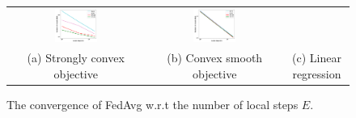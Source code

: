 \begin{figure}
\begin{tabular}{ccc}
	\includegraphics[width=0.33\textwidth]{fig/paper-cvxsmoothspeedupEpochsRounds-min-w8a-epsilon0134-reg0.pdf} & 
	\includegraphics[width=0.33\textwidth]{fig/paper-linregression-newspeedupEpochsRounds-min-linearregressionw8a-epsilon002-reg0.pdf} \\
(a) Strongly convex objective & (b) Convex smooth objective & (c) Linear regression
	\end{tabular}
\caption{The convergence of FedAvg w.r.t the number of local steps $E$. }
\label{fig:e}
\end{figure}

